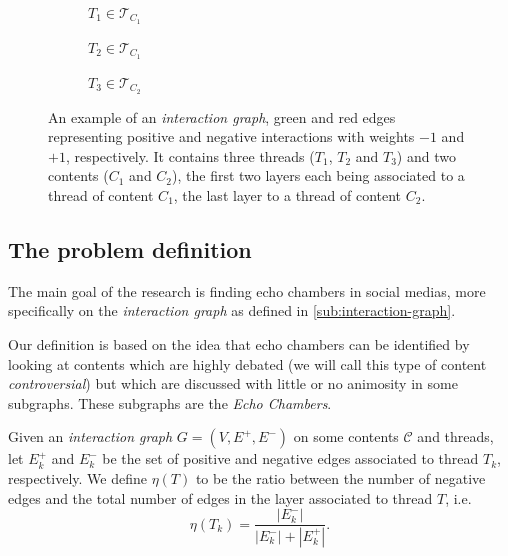 \begin{figure}
	\begin{center}
		\begin{subfigure}[b]{0.3\textwidth}
			\centering
			\caption{$T_{1} \in \mathcal{T}_{C_{1}} $}
			\label{fig:tex/tikz/graph_thread1.tikz}
		\end{subfigure}
		\begin{subfigure}[b]{0.3\textwidth}
			\centering
			\caption{$T_{2} \in \mathcal{T}_{C_{1}} $}
			\label{fig:tex/tikz/graph_thread2.tikz}
		\end{subfigure}
		\begin{subfigure}[b]{0.3\textwidth}
			\centering
			\caption{$T_{3} \in \mathcal{T}_{C_{2}} $}
			\label{fig:tex/tikz/graph_thread3.tikz}
		\end{subfigure}
	\end{center}
	\caption[Example of an \emph{interaction graph}]{An example of an \emph{interaction graph}, green and red edges
		representing positive and negative interactions with weights $-1$ and
		$+1$, respectively. It
		contains three threads ($T_1$, $T_2$ and $T_3$) and two contents ($C_1$
		and $C_2$), the first two layers each being
		associated to a thread of content $C_{1} $, the last layer to a thread
		of content $C_{2} $.}
	\label{fig:interaction-graph-example}
\end{figure}

\subsection{The problem definition}%
\label{sub:the_problem_definition}

The main goal of the research is finding echo chambers in social medias, more
specifically on the \emph{interaction graph} as defined in
\autoref{sub:interaction-graph}.

Our definition is based on the idea that echo chambers can be identified by
looking at contents which are highly debated (we will call
this type of content \emph{controversial}) but which are discussed with little
or no animosity in some subgraphs. These subgraphs are the \emph{Echo
	Chambers}.

\bigskip

Given an \emph{interaction graph} $G = (V, E^{+}, E^{-})$ on some contents
$\mathcal{C} $ and threads, let $E^{+}_k$ and $E^{-}_k$ be the set of
positive and negative edges associated to thread $T_k$, respectively. We define
$\eta(T)$ to be the ratio between the number of
negative edges and the total number of edges in the layer associated to thread
$T$, i.e.
\begin{equation*}
	\eta(T_k) = \frac{|E^{-}_{k}|}{|E^{-}_{k}| + |E^{+}_{k}|}.
\end{equation*}

